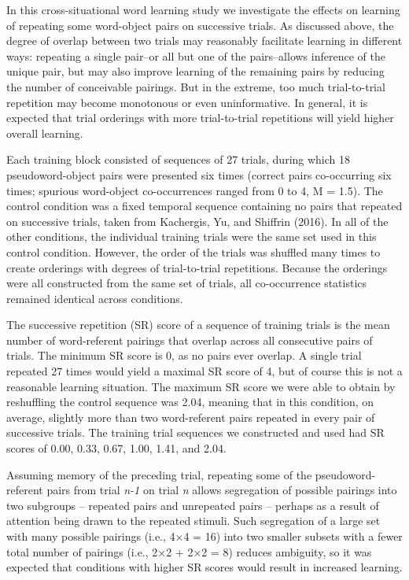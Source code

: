 \documentclass[man,floatsintext]{apa6}
\begin{document}
In this cross-situational word learning study we investigate the effects on learning of repeating some word-object pairs on successive trials.
As discussed above, the degree of overlap between two trials may reasonably facilitate learning in different ways: repeating a single pair--or all but one of the pairs--allows inference of the unique pair, but may also improve learning of the remaining pairs by reducing the number of conceivable pairings.
But in the extreme, too much trial-to-trial repetition may become monotonous or even uninformative.
In general, it is expected that trial orderings with more trial-to-trial repetitions will yield higher overall learning.

Each training block consisted of sequences of 27 trials, during which 18 pseudoword-object pairs were presented six times (correct pairs co-occurring six times; spurious word-object co-occurrences ranged from 0 to 4, M = 1.5).
The control condition was a fixed temporal sequence containing no pairs that repeated on successive trials, taken from Kachergis, Yu, and Shiffrin (2016).
In all of the other conditions, the individual training trials were the same set used in this control condition.
However, the order of the trials was shuffled many times to create orderings with degrees of trial-to-trial repetitions.
Because the orderings were all constructed from the same set of trials, all co-occurrence statistics remained identical across conditions.

The successive repetition (SR) score of a sequence of training trials is the mean number of word-referent pairings that overlap across all consecutive pairs of trials.
The minimum SR score is 0, as no pairs ever overlap.
A single trial repeated 27 times would yield a maximal SR score of 4, but of course this is not a reasonable learning situation.
The maximum SR score we were able to obtain by reshuffling the control sequence was 2.04, meaning that in this condition, on average, slightly more than two word-referent pairs repeated in every pair of successive trials.
The training trial sequences we constructed and used had SR scores of 0.00, 0.33, 0.67, 1.00, 1.41, and 2.04.

Assuming memory of the preceding trial, repeating some of the pseudoword-referent pairs from trial \emph{n-1} on trial \emph{n} allows segregation of possible pairings into two subgroups -- repeated pairs and unrepeated pairs -- perhaps as a result of attention being drawn to the repeated stimuli.
Such segregation of a large set with many possible pairings (i.e., 4×4 = 16) into two smaller subsets with a fewer total number of pairings (i.e., 2×2 + 2×2 = 8) reduces ambiguity, so it was expected that conditions with higher SR scores would result in increased learning.
\end{document}
